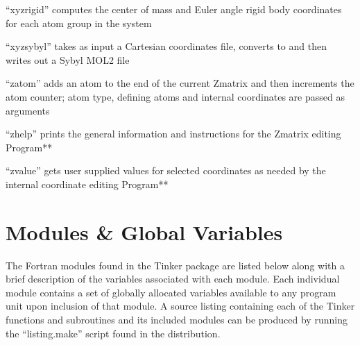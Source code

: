 \documentclass[letterpaper,11pt,english]{sphinxmanual}
\begin{document}
“xyzrigid” computes the center of mass and Euler angle rigid body coordinates for each atom group in the system


“xyzsybyl” takes as input a Cartesian coordinates file, converts to and then writes out a Sybyl MOL2 file


“zatom” adds an atom to the end of the current Z\sphinxhyphen{}matrix and then increments the atom counter; atom type, defining atoms and internal coordinates are passed as arguments


“zhelp” prints the general information and instructions for the Z\sphinxhyphen{}matrix editing Program**


“zvalue” gets user supplied values for selected coordinates as needed by the internal coordinate editing Program**


\chapter{Modules \& Global Variables}
\label{\detokenize{text/modules:modules-global-variables}}\label{\detokenize{text/modules::doc}}
The Fortran modules found in the Tinker package are listed below along with a brief description of the variables associated with each module. Each individual module contains a set of globally allocated variables available to any program unit upon inclusion of that module. A source listing containing each of the Tinker functions and subroutines and its included modules can be produced by running the “listing.make” script found in the distribution.

\end{document}
